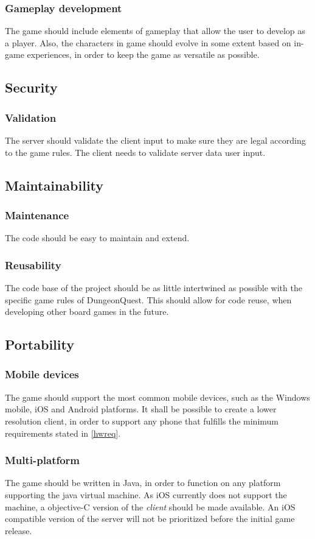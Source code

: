 \documentclass[a4paper,10pt]{article}
\begin{document}
\subsubsection{Gameplay development}
The game should include elements of gameplay that allow the user to develop as a player. Also, the characters in game should evolve in some extent based on in-game experiences, in order to keep the game as versatile as possible.

\subsection{Security}
\subsubsection{Validation}
\label{cheating}
The server should validate the client input to make sure they are legal according to the game rules. The client needs to validate server data user input. 
\subsection{Maintainability}
\subsubsection{Maintenance}
The code should be easy to maintain and extend.

\subsubsection{Reusability}
The code base of the project should be as little intertwined as possible with the specific game rules of DungeonQuest. This should allow for code reuse, when developing other board games in the future.

\subsection{Portability}
\subsubsection{Mobile devices}
The game should support the most common mobile devices, such as the Windows mobile, iOS and Android platforms. It shall be possible to create a lower resolution client, in order to support any phone that fulfills the minimum requirements stated in \ref{hwreq}.

\subsubsection{Multi-platform}
The game should be written in Java, in order to function on any platform supporting the java virtual machine. As iOS currently does not support the machine, a objective-C version of the \emph{client} should be made available. An iOS compatible version of the server will not be prioritized before the initial game release.
\end{document}
